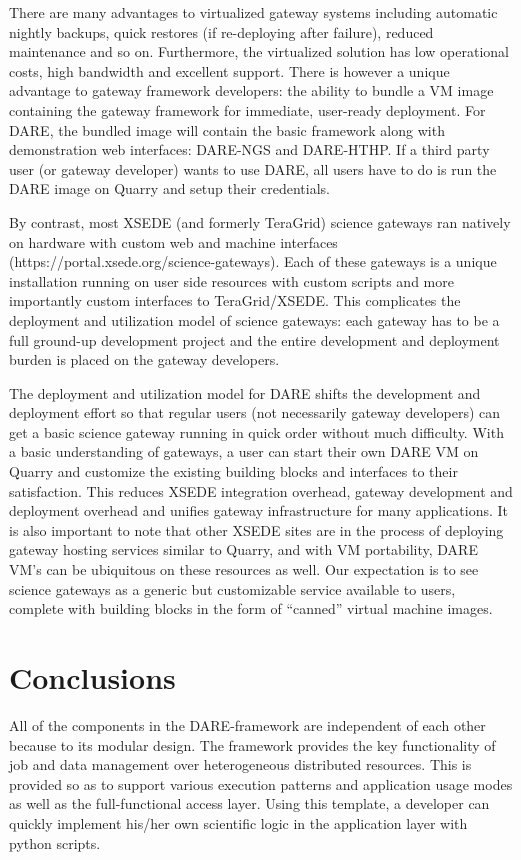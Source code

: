 \documentclass[]{svjour3}
\begin{document}
There are many advantages to virtualized gateway systems including
automatic nightly backups, quick restores (if re-deploying after failure),
reduced maintenance and so on. Furthermore, the virtualized solution has
low operational costs, high bandwidth and excellent support. There is however
a unique advantage to gateway framework developers: the ability to bundle
a VM image containing the gateway framework for immediate, user-ready deployment.
For DARE, the bundled image will contain the basic framework along with
demonstration web interfaces: DARE-NGS and DARE-HTHP. If a third party
user (or gateway developer) wants to use DARE, all users have to do is
run the DARE image on Quarry and setup their credentials.

By contrast, most XSEDE (and formerly TeraGrid) science gateways ran natively on hardware
with custom web and machine interfaces (https://portal.xsede.org/science-gateways).
Each of these gateways is a unique installation running on user side resources 
with custom scripts and more importantly custom interfaces to TeraGrid/XSEDE.
This complicates the deployment and utilization model of science gateways: each
gateway has to be a full ground-up development project and the entire development and deployment
burden is placed on the gateway developers.

The deployment and utilization model for DARE shifts the development and deployment
effort so that regular users (not necessarily gateway developers) can
get a basic science gateway running in quick order without much difficulty.
With a basic understanding of gateways, a user can start
their own DARE VM on Quarry and customize the existing building blocks
and interfaces to their satisfaction. This reduces XSEDE integration
overhead, gateway development and deployment overhead and unifies gateway
infrastructure for many applications. It is also important to note that
other XSEDE sites are in the process of deploying gateway hosting services
similar to Quarry, and with VM portability, DARE VM's can be ubiquitous on
these resources as well. Our expectation is to see science gateways as a
generic but customizable service available to users, complete with
building blocks in the form of ``canned'' virtual machine images.


\section{Conclusions}

All of the components in the DARE-framework are independent of each
other because to its modular design. The framework provides the key
functionality of job and data management over heterogeneous
distributed resources. This is provided so as to support various
execution patterns and application usage modes as well as the
full-functional access layer. Using this template, a developer can
quickly implement his/her own scientific logic in the application
layer with python scripts.
\end{document}
